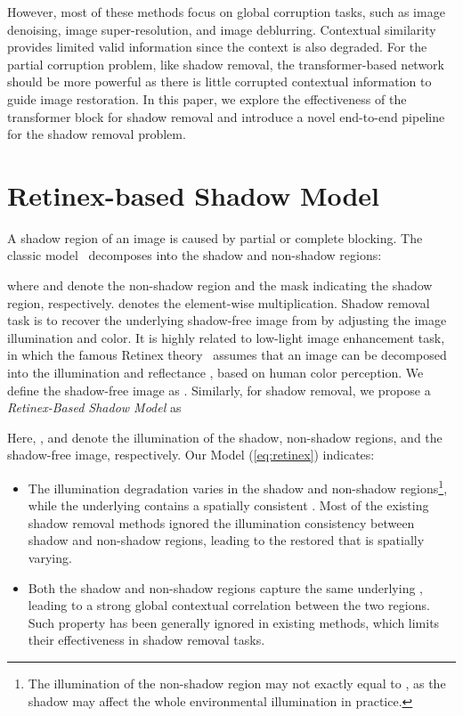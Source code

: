 \documentclass[letterpaper]{article} \usepackage{aaai23}  \usepackage{times}  \usepackage{helvet}  \usepackage{courier}  \usepackage[hyphens]{url}  \usepackage{graphicx} \urlstyle{rm} \def\UrlFont{\rm}  \usepackage{natbib}  \usepackage{caption} \frenchspacing  \setlength{\pdfpagewidth}{8.5in} \setlength{\pdfpageheight}{11in} \usepackage{algorithm}
\begin{document}
However, most of these methods focus on global corruption tasks, such as image denoising, image super-resolution, and image deblurring.
Contextual similarity provides limited valid information since the context is also degraded.
For the partial corruption problem, like shadow removal, the transformer-based network should be more powerful as there is little corrupted contextual information to guide image restoration.
In this paper, we explore the effectiveness of the transformer block for shadow removal and introduce a novel end-to-end pipeline for the shadow removal problem.





\section{Retinex-based Shadow Model}



{A shadow region of an image  is caused by partial or complete blocking. 
The classic model~\cite{porter1984compositing} decomposes  into the shadow and non-shadow regions:
}

{where  and  denote the non-shadow region and the mask indicating the shadow region, respectively.  denotes the element-wise multiplication.
Shadow removal task is to recover the underlying shadow-free image  from  by adjusting the image illumination and color. It is highly related to low-light image enhancement task, in which the famous Retinex theory~\cite{land1977retinex} assumes that an image  can be decomposed into the illumination  and reflectance , based on human color perception. We define the shadow-free image as .
Similarly, for shadow removal, we propose a \textit{Retinex-Based Shadow Model} as}

{Here, ,  and  denote the illumination of the shadow, non-shadow regions, and the shadow-free image, respectively. Our Model (\ref{eq:retinex}) indicates:}
\begin{itemize}
\item The illumination degradation varies in the shadow and non-shadow regions\footnote{The illumination of the non-shadow region  may not exactly equal to , as the shadow may affect the whole environmental illumination in practice.}, while the underlying  contains a spatially consistent . 
Most of the existing shadow removal methods ignored the  illumination consistency between shadow and non-shadow regions, leading to the restored  that is spatially varying.
\item Both the shadow and non-shadow regions capture the same underlying , leading to a strong global contextual correlation between the two regions. Such property has been generally ignored in existing methods, which limits their effectiveness in shadow removal tasks. 
\end{itemize}
\end{document}
